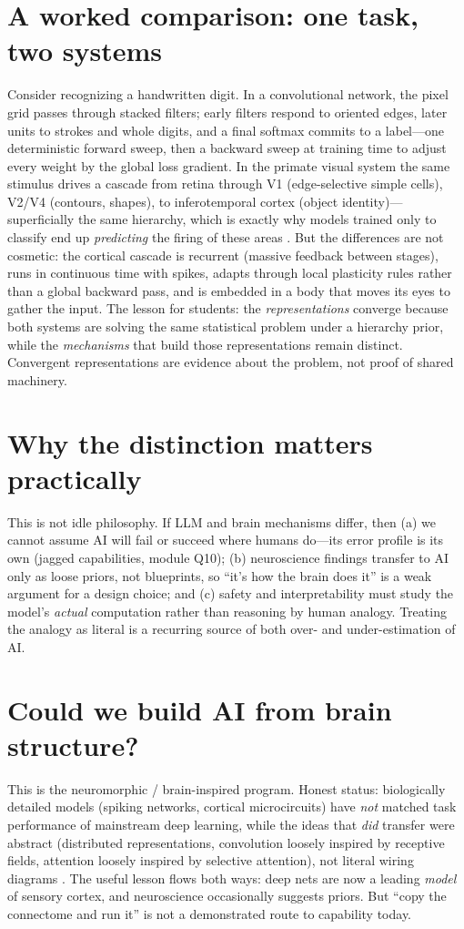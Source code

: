 \documentclass[11pt]{article}
\begin{document}
\section{A worked comparison: one task, two systems}
Consider recognizing a handwritten digit. In a convolutional network, the pixel grid passes through
stacked filters; early filters respond to oriented edges, later units to strokes and whole digits, and a
final softmax commits to a label---one deterministic forward sweep, then a backward sweep at training
time to adjust every weight by the global loss gradient. In the primate visual system the same stimulus
drives a cascade from retina through V1 (edge-selective simple cells), V2/V4 (contours, shapes), to
inferotemporal cortex (object identity)---superficially the same hierarchy, which is exactly why models
trained only to classify end up \emph{predicting} the firing of these areas \citep{yamins2014performance}.
But the differences are not cosmetic: the cortical cascade is recurrent (massive feedback between
stages), runs in continuous time with spikes, adapts through local plasticity rules rather than a global
backward pass, and is embedded in a body that moves its eyes to gather the input. The lesson for
students: the \emph{representations} converge because both systems are solving the same statistical
problem under a hierarchy prior, while the \emph{mechanisms} that build those representations remain
distinct. Convergent representations are evidence about the problem, not proof of shared machinery.

\section{Why the distinction matters practically}
This is not idle philosophy. If LLM and brain mechanisms differ, then (a) we cannot assume AI will fail
or succeed where humans do---its error profile is its own (jagged capabilities, module Q10); (b)
neuroscience findings transfer to AI only as loose priors, not blueprints, so ``it's how the brain does
it'' is a weak argument for a design choice; and (c) safety and interpretability must study the model's
\emph{actual} computation rather than reasoning by human analogy. Treating the analogy as literal is a
recurring source of both over- and under-estimation of AI.

\section{Could we build AI from brain structure?}
This is the neuromorphic / brain-inspired program. Honest status: biologically detailed models
(spiking networks, cortical microcircuits) have \emph{not} matched task performance of mainstream deep
learning, while the ideas that \emph{did} transfer were abstract (distributed representations,
convolution loosely inspired by receptive fields, attention loosely inspired by selective attention),
not literal wiring diagrams \citep{hassabis2017neuroscience}. The useful lesson flows both ways: deep
nets are now a leading \emph{model} of sensory cortex, and neuroscience occasionally suggests priors.
But ``copy the connectome and run it'' is not a demonstrated route to capability today.
\end{document}
